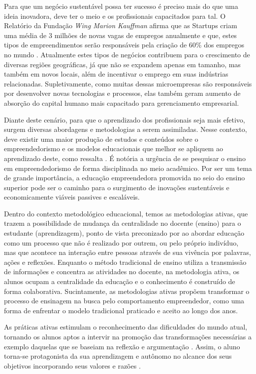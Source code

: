 Para que um negócio sustentável possa ter sucesso é preciso mais do que uma ideia inovadora, deve ter o meio e os profissionais capacitados para tal. O Relatório da Fundação \textit{Wing Marion Kauffman} afirma que as Startups criam uma média de 3 milhões de novas vagas de empregos anualmente e que, estes tipos de empreendimentos serão responsáveis pela criação de 60\% dos empregos no  mundo  \cite{brasil_o_2017}. 
Atualmente estes tipos de  negócios contribuem para o crescimento de diversas regiões geográficas, já que não se expandem apenas em tamanho, mas também em novos locais, além de incentivar o emprego em suas indústrias relacionadas. Supletivamente, como muitas dessas microempresas são responsáveis por desenvolver novas tecnologias e processos, elas também geram aumento de absorção do capital humano mais capacitado para gerenciamento empresarial.

Diante deste cenário, para que o aprendizado dos profissionais seja mais efetivo, surgem diversas abordagens e metodologias a serem assimiladas. Nesse contexto, deve existir uma maior produção de estudos e conteúdos sobre o empreendedorismo e os modelos educacionais que melhor se apliquem ao aprendizado deste, como ressalta . É notória a urgência de se pesquisar o ensino em empreendedorismo de forma disciplinada no meio acadêmico. Por ser um tema de grande importância, a educação empreendedora promovida no seio do ensino superior pode ser o caminho para o surgimento de inovações sustentáveis e economicamente viáveis passives e escaláveis.

Dentro do contexto metodológico educacional, temos as metodologias ativas, que trazem a possibilidade de mudança da centralidade no docente (ensino) para o estudante (aprendizagem), ponto de vista preconizado por  ao abordar educação como um processo que não é realizado por outrem, ou pelo próprio indivíduo, mas que acontece na interação entre pessoas através de sua vivência por palavras, ações e reflexões. 
Enquanto o método tradicional de ensino utiliza a transmissão de informações e concentra as atividades no docente, na metodologia ativa, os alunos ocupam a centralidade da educação e o conhecimento é construído de forma colaborativa. Sucintamente, as metodologias ativas propõem transformar o processo de ensinagem na busca pelo comportamento empreendedor, como uma forma de enfrentar o modelo tradicional praticado e aceito ao longo dos anos.
 
As práticas ativas estimulam o reconhecimento das dificuldades do mundo atual, tornando os alunos aptos a intervir na promoção das transformações necessárias a exemplo daquelas que se baseiam na reflexão e argumentação \cite{bezanilla_methodologies_2019}. Assim, o aluno torna-se protagonista da sua aprendizagem e autônomo no alcance dos seus objetivos incorporando seus valores e razões \cite{rubel_student_2016}. 

